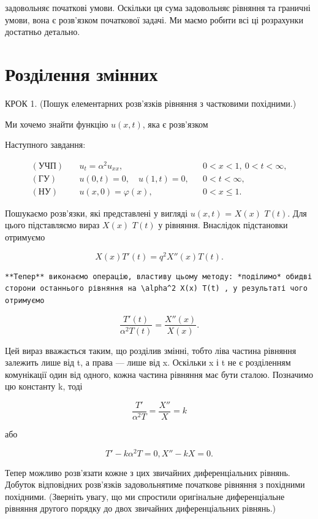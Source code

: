 \documentclass[
  ukrainian,
]{article}
\begin{document}
задовольняє початкові умови. Оскільки ця сума задовольняє рівняння та
граничні умови, вона є розв'язком початкової задачі. Ми маємо робити всі
ці розрахунки достатньо детально.

\section{Розділення
змінних}\label{ux440ux43eux437ux434ux456ux43bux435ux43dux43dux44f-ux437ux43cux456ux43dux43dux438ux445}

КРОК 1. (Пошук елементарних розв'язків рівняння з частковими похідними.)

Ми хочемо знайти функцію \(u(x, t)\), яка є розв'язком

Наступного завдання:

\[
\begin{aligned}
(\text{УЧП})\quad & u_t = \alpha^2 u_{xx}, && 0 < x < 1,\ 0 < t < \infty, \\
(\text{ГУ})\quad & u(0,t) = 0,\quad u(1,t) = 0, && 0 < t < \infty, \\
(\text{НУ})\quad & u(x,0) = \varphi(x), && 0 < x \leqslant 1.
\end{aligned}
\]

Пошукаємо розв'язки, які представлені у вигляді \(u(x, t)\) = \(X(x)\)
\(T(t)\). Для цього підставляємо вираз \(X(x)\) \(T(t)\) у рівняння.
Внаслідок підстановки отримуємо

\[
X(x) T'(t) = q^2 X''(x) T(t).
\]

\begin{verbatim}
**Тепер** виконаємо операцію, властиву цьому методу: *поділимо* обидві сторони останнього рівняння на \alpha^2 X(x) T(t) , у результаті чого отримуємо
\end{verbatim}

\[
\frac{T'(t)}{\alpha^2 T(t)} = \frac{X''(x)}{X(x)}.
\]

Цей вираз вважається таким, що розділив змінні, тобто ліва частина
рівняння залежить лише від t, а права --- лише від x. Оскільки x і t не
є розділенням комунікації один від одного, кожна частина рівняння має
бути сталою. Позначимо цю константу k, тоді

\[
\frac{T'}{\alpha^2 T} = \frac{X''}{X} = k
\]

або

\[
T'-k\alpha^2T=0,
X''-kX=0.
\]

Тепер можливо розв'язати кожне з цих звичайних диференціальних рівнянь.
Добуток відповідних розв'язків задовольнятиме початкове рівняння з
похідними похідними. (Зверніть увагу, що ми спростили оригінальне
диференціальне рівняння другого порядку до двох звичайних
диференціальних рівнянь.)
\end{document}
